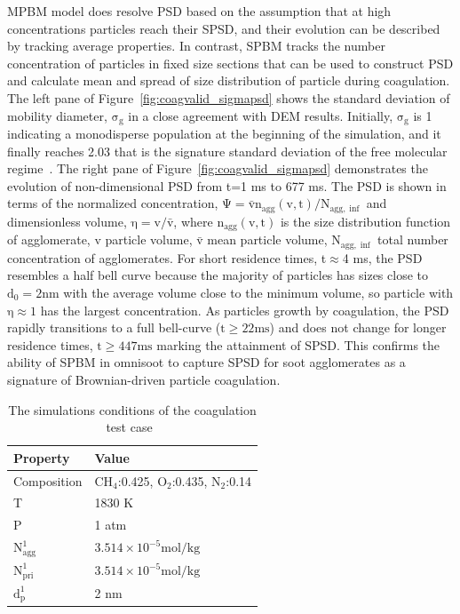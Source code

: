 MPBM model does resolve PSD based on the assumption that at high concentrations particles reach their SPSD, and their evolution can be described by tracking average properties. In contrast, SPBM tracks the number concentration of particles in fixed size sections that can be used to construct PSD and calculate mean and spread of size distribution of particle during coagulation. The left pane of Figure~\ref{fig:coagvalid_sigmapsd} shows the standard deviation of mobility diameter, $\mathrm{\sigma_g}$ in a close agreement with DEM results. Initially, $\mathrm{\sigma_g}$ is 1 indicating a monodisperse population at the beginning of the simulation, and it finally reaches 2.03 that is the signature standard deviation of the free molecular regime~\citep{vemury1995self}. The right pane of Figure~\ref{fig:coagvalid_sigmapsd} demonstrates the evolution of non-dimensional PSD from t=1 ms to 677 ms. The PSD is shown in terms of the normalized concentration, $\mathrm{\Psi= \bar{v}n_{agg}(v,t)/N_{agg,\inf}}$ and dimensionless volume, $\mathrm{\eta= v/ \bar{v}}$, where $\mathrm{n_{agg}(v,t)}$ is the size distribution function of agglomerate, $\mathrm{v}$ particle volume, $\mathrm{\bar{v}}$ mean particle volume, $\mathrm{N_{agg,\inf}}$ total number concentration of agglomerates. For short residence times, t$\approx$4 ms, the PSD resembles a half bell curve because the majority of particles has sizes close to $\mathrm{d_0=2 nm}$ with the average volume close to the minimum volume, so particle with $\mathrm{\eta\approx1}$ has the largest concentration. As particles growth by coagulation, the PSD rapidly transitions to a full bell-curve ($\mathrm{t\ge22 ms}$) and does not change for longer residence times, $\mathrm{t\ge447 ms}$ marking the attainment of SPSD. This confirms the ability of SPBM in omnisoot to capture SPSD for soot agglomerates as a signature of Brownian-driven particle coagulation.  

\begin{table}
	\caption{The simulations conditions of the coagulation test case~\citep{kholghy2021surface}}
	\label{tab:simcond_coagtest}
	\centering
	\begin{tabular}{l l}
		\hline
		\textbf{Property} & \textbf{Value} \\
		\hline
		Composition & $\mathrm{CH_4}$:0.425, $\mathrm{O_2}$:0.435, $\mathrm{N_2}$:0.14\\
		T & 1830 K\\
		P & 1 atm \\
		$\mathrm{N^1_{agg}}$ & $3.514\times10^{-5} \mathrm{mol/kg}$ \\ 
		$\mathrm{N^1_{pri}}$ & $3.514\times10^{-5} \mathrm{mol/kg}$\\
		$\mathrm{d^1_{p}}$ & 2 nm \\
		\hline
	\end{tabular}
\end{table}

